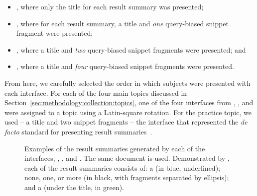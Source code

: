 \begin{itemize}
    \item{, where only the title for each result summary was presented;}
    \item{, where for each result summary, a title and \emph{one} query-biased snippet fragment were presented;}
    \item{, where a title and \emph{two} query-biased snippet fragments were presented; and}
    \item{, where a title and \emph{four} query-biased snippet fragments were presented.}
\end{itemize}


From here, we carefully selected the order in which subjects were presented with each interface. For each of the four main topics discussed in Section~\ref{sec:methodology:collection:topics}, one of the four interfaces from , ,  and  were assigned to a topic using a Latin-square rotation. For the practice topic, we used  -- a title and two snippet fragments -- the interface that represented the \emph{de facto} standard for presenting result summaries~\citep{hearst2009_search}.

\begin{figure}[t!]
    \centering
    \caption[Examples of result summaries across experimental interfaces]{Examples of the result summaries generated by each of the interfaces, , ,  and . The same document is used. Demonstrated by \searchlogo, each of the result summaries consists of: a  (in blue, underlined); none, one, or more  (in black, with fragments separated by ellipsis); and a  (under the title, in green).}
    \label{fig:interface_snippets}
\end{figure}


